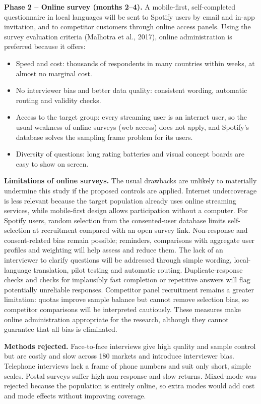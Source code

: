\documentclass[11pt,a4paper]{article}
\begin{document}
\textbf{Phase 2 – Online survey (months 2–4).} A mobile-first, self-completed questionnaire in local languages will be sent to Spotify users by email and in-app invitation, and to competitor customers through online access panels. Using the survey evaluation criteria (Malhotra et al., 2017), online administration is preferred because it offers:

\begin{itemize}
\item Speed and cost: thousands of respondents in many countries within weeks, at almost no marginal cost.
\item No interviewer bias and better data quality: consistent wording, automatic routing and validity checks.
\item Access to the target group: every streaming user is an internet user, so the usual weakness of online surveys (web access) does not apply, and Spotify's database solves the sampling frame problem for its users.
\item Diversity of questions: long rating batteries and visual concept boards are easy to show on screen.
\end{itemize}
\textbf{Limitations of online surveys.} The usual drawbacks are unlikely to materially undermine this study if the proposed controls are applied. Internet undercoverage is less relevant because the target population already uses online streaming services, while mobile-first design allows participation without a computer. For Spotify users, random selection from the consented-user database limits self-selection at recruitment compared with an open survey link. Non-response and consent-related bias remain possible; reminders, comparisons with aggregate user profiles and weighting will help assess and reduce them. The lack of an interviewer to clarify questions will be addressed through simple wording, local-language translation, pilot testing and automatic routing. Duplicate-response checks and checks for implausibly fast completion or repetitive answers will flag potentially unreliable responses. Competitor panel recruitment remains a greater limitation: quotas improve sample balance but cannot remove selection bias, so competitor comparisons will be interpreted cautiously. These measures make online administration appropriate for the research, although they cannot guarantee that all bias is eliminated.

\textbf{Methods rejected.} Face-to-face interviews give high quality and sample control but are costly and slow across 180 markets and introduce interviewer bias. Telephone interviews lack a frame of phone numbers and suit only short, simple scales. Postal surveys suffer high non-response and slow returns. Mixed-mode was rejected because the population is entirely online, so extra modes would add cost and mode effects without improving coverage.
\end{document}
